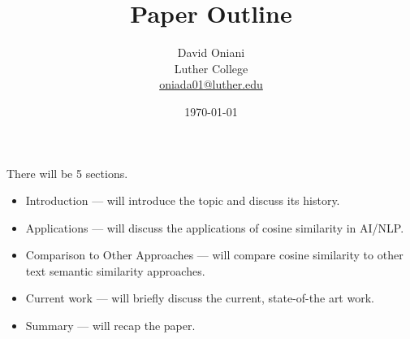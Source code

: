 \documentclass[11pt]{article}
\author{David Oniani\\
        Luther College\\
        \href{mailto:oniada01@luther.edu}{oniada01@luther.edu}}
\title{Paper Outline}
\date{\today}
\begin{document}
\maketitle

There will be 5 sections.

\begin{itemize}

  \item Introduction --- will introduce the topic and discuss its history.

  \item Applications --- will discuss the applications of cosine similarity in
        AI/NLP.

  \item Comparison to Other Approaches --- will compare cosine similarity to
        other text semantic similarity approaches.

  \item Current work --- will briefly discuss the current, state-of-the art
        work.

  \item Summary --- will recap the paper.
\end{itemize}




\printbibliography%

\end{document}
